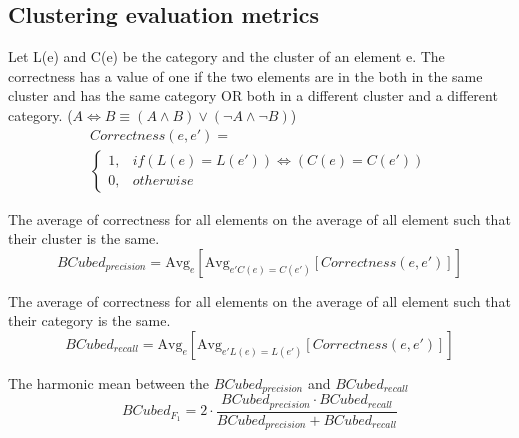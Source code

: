 \subsection{Clustering evaluation metrics}

\begin{definition}
  Let L(e) and C(e) be the category and the cluster of an element e.
  The correctness has a value of one if the two elements are in the both in the same cluster and has the same category OR both in a different cluster and a different category. ($A \Longleftrightarrow B \equiv (A \land B) \lor (\neg A \land \neg B)$)
  \begin{gather*}
    Correctness(e, e') = \\
    \begin{cases}
      1, & if (L(e) = L(e')) \Longleftrightarrow (C(e) = C(e'))\\
      0, & otherwise
    \end{cases}
  \end{gather*}
\end{definition}

\begin{definition}
  The average of correctness for all elements on the average of all element such that their cluster is the same.
  \begin{equation}
    BCubed_{precision} = \text{Avg}_{e}[\text{Avg}_{e' C(e)=C(e')}[Correctness(e, e')]]
  \end{equation}
\end{definition}

\begin{definition}
  The average of correctness for all elements on the average of all element such that their category is the same.
  \begin{equation}
    BCubed_{recall} = \text{Avg}_{e}[\text{Avg}_{e' L(e)=L(e')}[Correctness(e, e')]]
  \end{equation}
\end{definition}

\begin{definition}
  The harmonic mean between the $BCubed_{precision}$ and $BCubed_{recall}$
  \begin{equation}
    BCubed_{F_1} =
    2 \cdot \frac{BCubed_{precision} \cdot BCubed_{recall}}
    {BCubed_{precision} + BCubed_{recall}}
  \end{equation}
\end{definition}
